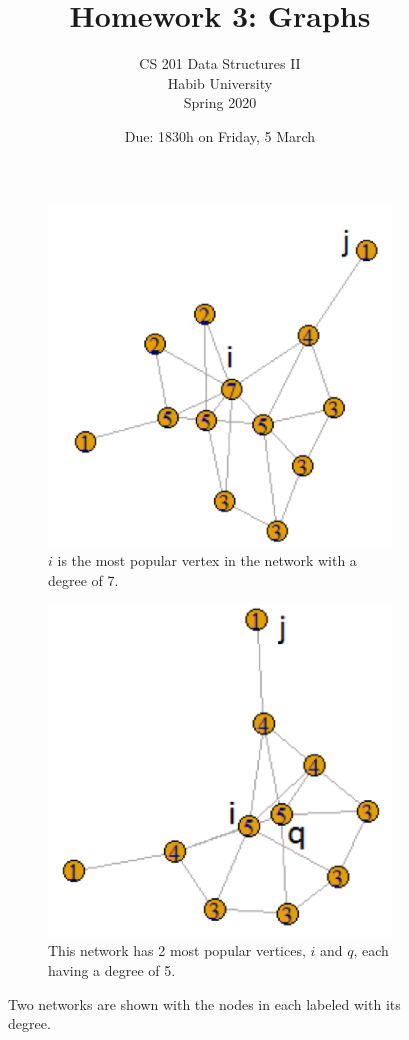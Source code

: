 \documentclass[addpoints]{exam}
\title{Homework 3: Graphs}
\author{CS 201 Data Structures II\\Habib University\\Spring 2020}
\date{Due: 1830h on Friday, 5 March}
\begin{document}
\maketitle

\begin{figure}[h]
  \centering
  \begin{subfigure}{.48\textwidth}
    \includegraphics{fig1}
    \caption{$i$ is the most popular vertex in the network with a degree of 7.}
    \label{fig1}
  \end{subfigure}
  \begin{subfigure}{.48\textwidth}
    \includegraphics{fig2}
    \caption{This network has 2 most popular vertices, $i$ and $q$, each having a degree of 5.}
    \label{fig2}
  \end{subfigure}
  \caption{Two networks are shown with the nodes in each labeled with its degree.}
  \label{fig:figs}
\end{figure}
\end{document}
